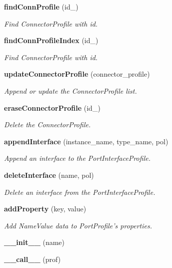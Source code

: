 \begin{CompactItemize}
{\bf find\-Conn\-Profile} (id\_\-)
\begin{CompactList}\small\item\em Find Connector\-Profile with id. \item\end{CompactList}\item 
{\bf find\-Conn\-Profile\-Index} (id\_\-)
\begin{CompactList}\small\item\em Find Connector\-Profile with id. \item\end{CompactList}\item 
{\bf update\-Connector\-Profile} (connector\_\-profile)
\begin{CompactList}\small\item\em Append or update the Connector\-Profile list. \item\end{CompactList}\item 
{\bf erase\-Connector\-Profile} (id\_\-)
\begin{CompactList}\small\item\em Delete the Connector\-Profile. \item\end{CompactList}\item 
{\bf append\-Interface} (instance\_\-name, type\_\-name, pol)
\begin{CompactList}\small\item\em Append an interface to the Port\-Interface\-Profile. \item\end{CompactList}\item 
{\bf delete\-Interface} (name, pol)
\begin{CompactList}\small\item\em Delete an interface from the Port\-Interface\-Profile. \item\end{CompactList}\item 
{\bf add\-Property} (key, value)
\begin{CompactList}\small\item\em Add Name\-Value data to Port\-Profile's properties. \item\end{CompactList}\item 
{\bf \_\-\_\-init\_\-\_\-} (name)
\item 
{\bf \_\-\_\-call\_\-\_\-} (prof)
\item 

\end{CompactItemize}
